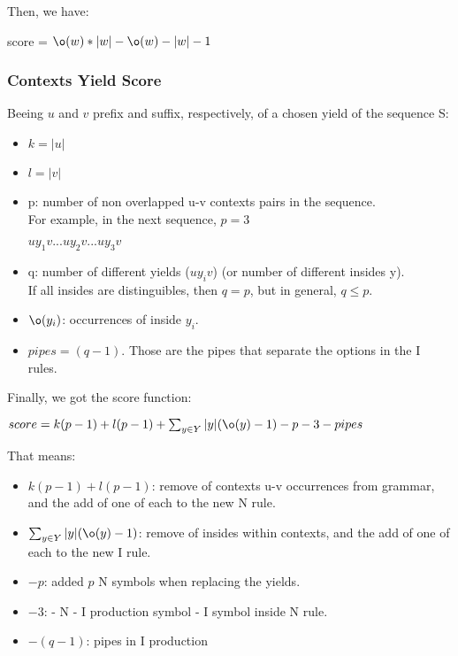 	Then, we have: \\
	\begin{center}
		 score =  $\o(w)*|w| - \o(w) - |w| - 1$
	\end{center}

\subsubsection{Contexts Yield Score}

Beeing $u$ and $v$ prefix and suffix, respectively, of a chosen yield of the sequence S:\\

	\begin{itemize}
		\item $k = |u|$
		\item $l = |v|$
		\item p: number of non overlapped u-v contexts pairs in the sequence. \\
		For example, in the next sequence, $p=3$ \\
		\begin{center}
		$uy_1v ... uy_2v ... uy_3v$
		\end{center}
		\item q: number of different yields ($uy_iv$) (or number of different insides y). \\
		If all insides are distinguibles, then $q = p$, but in general, $q \leq p$.
		\item $\o(y_i)$: occurrences of inside $y_i$.
		\item $pipes = (q-1)$. Those are the pipes that separate the options in the
		I rules.
	\end{itemize}
	Finally, we got the score function: \\
	\begin{center}
		$score = k(p-1) + l(p-1) + \sum_{y \in Y} |y|(\o(y)-1) -
                          p - 3 - pipes$
	\end{center}

	That means:\\

	\begin{itemize}
		\item $k(p-1) + l(p-1)$: remove of contexts u-v occurrences from grammar, and
		the add of one of each to the new N rule.
		\item $\sum_{y \in Y} |y|(\o(y)-1)$: remove of insides within contexts, and
		the add of one of each to the new I rule.
		\item $-p$: added $p$ N symbols when replacing the yields.
		\item $-3$: - N - I production symbol - I symbol inside N rule.
		\item $-(q-1)$: pipes in I production
	\end{itemize}

